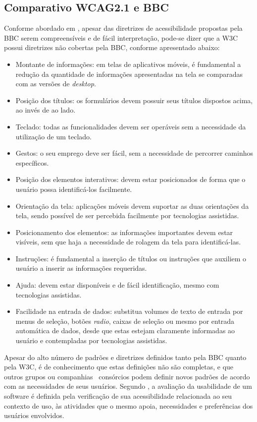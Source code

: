 \documentclass[
	12pt,				%
	oneside,			%
	a4paper,			%
	english,			%
	brazil				%
	]{abntex2ppgsi}
\begin{document}
\subsection{Comparativo WCAG2.1 e BBC}
Conforme abordado em \cite{camilamaster}, apesar das diretrizes de acessibilidade propostas pela BBC serem compreensíveis e de fácil interpretação, pode-se dizer que a W3C possui diretrizes não cobertas pela BBC, conforme apresentado abaixo:
\begin{itemize}
	\item Montante de informações: em telas de aplicativos móveis, é fundamental a redução da quantidade de informações apresentadas na tela se comparadas com as versões de \textit{desktop}.
	\item Posição dos títulos: os formulários devem possuir seus títulos dispostos acima, ao invés de ao lado.
	\item Teclado: todas as funcionalidades devem ser operáveis sem a necessidade da utilização de um teclado.
	\item Gestos: o seu emprego deve ser fácil, sem a necessidade de percorrer caminhos específicos.
	\item Posição dos elementos interativos: devem estar posicionados de forma que o usuário possa identificá-los facilmente.
	\item Orientação da tela: aplicações móveis devem suportar as duas orientações da tela, sendo possível de ser percebida facilmente por tecnologias assistidas.
	\item Posicionamento dos elementos: as informações importantes devem estar visíveis, sem que haja a necessidade de rolagem da tela para identificá-las.
	\item Instruções: é fundamental a inserção de títulos ou instruções que auxiliem o usuário a inserir as informações requeridas.
	\item Ajuda: devem estar disponíveis e de fácil identificação, mesmo com tecnologias assistidas.
	\item Facilidade na entrada de dados: substitua volumes de texto de entrada por menus de seleção, botões \textit{radio}, caixas de seleção ou mesmo por entrada automática de dados, desde que estas estejam claramente informadas ao usuário e contempladas por tecnologias assistidas.
\end{itemize}

Apesar do alto número de padrões e diretrizes definidos tanto pela BBC quanto pela W3C, é de conhecimento que estas definições não são completas, e que outros grupos ou companhias \ consórcios podem definir novos padrões de acordo com as necessidades de seus usuários. Segundo \cite{meloihc2004}, a avaliação da usabilidade de um software é definida pela verificação de sua acessibilidade relacionada ao seu contexto de uso, às atividades que o mesmo apoia, necessidades e preferências dos usuários envolvidos.  
\end{document}

